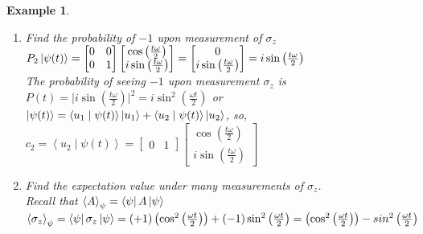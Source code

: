 \documentclass[12pt]{article}
\theoremstyle{plain}
\theoremstyle{nonumberplain}
\theoremstyle{plain}
\newtheorem{example}[lemma]{Example}
\theoremstyle{nonumberplain}
\newcommand\1{{\bf 1}}
\newcommand{\bmat}[1]{\begin{bmatrix*} #1 \end{bmatrix*}} %
\newcommand{\<}{\left\langle}
\renewcommand{\>}{\right\rangle}
\newcommand{\inp}[2]{\left\langle#1\mid #2\right\rangle} %
\newcommand{\sinx}[1]{\sin\left(#1\right)}
\newcommand{\cosx}[1]{\cos\left(#1\right)}
\begin{document}
\begin{example}
\begin{enumerate}[label=(\alph*)]
Therefore, the probability of seeing $+1$ upon measurement $\sigma_z$ is $P(t)=\vert\cosx{\frac{t\omega}{2}}\vert^2=\cos^2\left(\frac{\omega t}{2}\right)$
\item Find the probability of $-1$ upon measurement of $\sigma_z$ \\
$P_2\ket{\psi(t)}=\bmat{0 & 0 \\ 0 & 1}\bmat{\cosx{\frac{t\omega}{2}} \\ i\sinx{\frac{t\omega}{2}}}=\bmat{0 \\ i\sinx{\frac{t\omega}{2}}}=i\sinx{\frac{t\omega}{2}}$ \\
The probability of seeing $-1$ upon measurement $\sigma_z$ is $P(t)=\vert i\sinx{\frac{t\omega}{2}}\vert^2=i\sin^2\left(\frac{\omega t}{2}\right)$ \textit{or} $\ket{\psi(t)}=\inp{u_1}{\psi(t)}\ket{u_1}+\inp{u_2}{\psi(t)}\ket{u_2}$, so, $c_2=\inp{u_2}{\psi(t)}=\bmat{0 & 1}\bmat{\cosx{\frac{t\omega}{2}} \\ i\sinx{\frac{t\omega}{2}}}$
\item Find the expectation value under many measurements of $\sigma_z$. \\ Recall that $\left\langle A \right\rangle_\psi=\bra{\psi}A\ket{\psi}$ \\
$\left\langle \sigma_z \right\rangle_\psi=\bra{\psi}\sigma_z\ket{\psi}=(+1)\left(\cos^2\left(\frac{\omega t}{2}\right)\right)+(-1)\sin^2\left(\frac{\omega t}{2}\right)=\left(\cos^2\left(\frac{\omega t}{2}\right)\right)-sin^2\left(\frac{\omega t}{2}\right)$
\end{enumerate}
\end{example}

\end{document}
